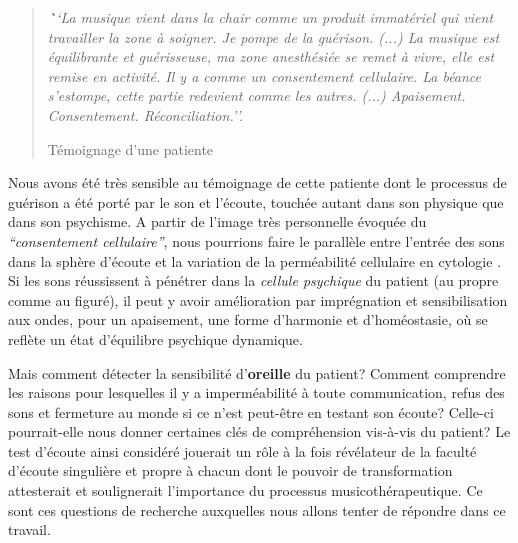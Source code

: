 

\begin{quotation}
 \textit{\textbf ``La musique vient dans la chair comme un produit immatériel
 qui vient travailler la zone à soigner. Je pompe de la
 guérison.
 (...)
 La musique est équilibrante et guérisseuse, ma zone
 anesthésiée se remet à vivre, elle est remise en activité.
 Il y a comme un consentement cellulaire.
La béance s'estompe, cette
partie redevient comme les autres. (...)
Apaisement. Consentement. Réconciliation.''.}

Témoignage d'une patiente

\end{quotation}



Nous avons été très sensible au témoignage de cette patiente dont le
processus de guérison a été porté par le son et l'écoute, touchée
autant dans son physique
que dans son psychisme.
A partir de l'image très personnelle évoquée du
\textit{``consentement cellulaire''}, nous pourrions faire le
parallèle entre l'entrée des sons dans la sphère d'écoute et la variation de la
perméabilité cellulaire en cytologie \autocite[70--76]{marieb:biologie}. Si les sons réussissent à pénétrer dans la
\textit{cellule psychique} du patient (au propre comme au figuré),  il peut y avoir amélioration par imprégnation et sensibilisation aux ondes, pour un apaisement, une forme d'harmonie et d'homéostasie,  \autocite[10]{marieb:biologie} où se reflète un état d'équilibre psychique dynamique.

Mais comment détecter la sensibilité d'\textbf{oreille} du patient?
Comment comprendre les raisons pour lesquelles il y a imperméabilité à toute communication, refus des sons et fermeture au monde si ce n'est
peut-être en testant
son écoute?  Celle-ci pourrait-elle nous donner certaines clés de compréhension vis-à-vis du patient?
Le test d'écoute ainsi considéré jouerait un rôle à la fois révélateur de la faculté d'écoute singulière et 
propre à chacun dont le  pouvoir de transformation attesterait  et soulignerait l'importance du processus 
musicothérapeutique.
Ce sont ces questions de recherche auxquelles nous allons tenter de répondre dans ce travail.


